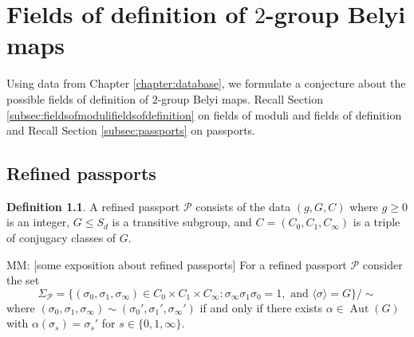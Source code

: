 \documentclass{dcthesis}
\newcommand{\PP}{\mathbb P}
\newcommand{\QQ}{\mathbb Q}
\newcommand{\defi}[1]{\textsf{#1}}
\newcommand{\mm}[1]{{\color{blue} \sf MM: [#1]}}
\DeclareMathOperator{\Aut}{Aut}
\newtheorem{theorem}[prop]{Theorem}
\theoremstyle{definition}
\newtheorem{definition}[prop]{Definition}
\theoremstyle{remark}
\numberwithin{equation}{section}
\numberwithin{figure}{section}
\begin{document}
\chapter{Fields of definition of $2$-group Belyi maps}{\label{chapter:fieldsofdefinition}
  Using data from Chapter \ref{chapter:database},
  we formulate a conjecture about the possible fields of definition of
  $2$-group Belyi maps.
  Recall Section
  \ref{subsec:fieldsofmodulifieldsofdefinition}
  on fields of moduli and fields of definition
  and
  Recall Section \ref{subsec:passports} on passports.
  \section{Refined passports}{\label{sec:refined}}{
    \begin{definition}\label{def:refined}
      A \defi{refined passport} $\mathcal{P}$ consists of the data
      $(g,G,C)$
      where $g\geq 0$ is an integer,
      $G\leq S_d$ is a transitive subgroup,
      and $C = (C_0,C_1,C_\infty)$
      is a triple of conjugacy classes of $G$.
    \end{definition}
    \mm{some exposition about refined passports}
    For a refined passport $\mathcal{P}$ consider the set
    \[
      \Sigma_\mathcal{P} =
      \{(\sigma_0,\sigma_1,\sigma_\infty)\in C_0\times C_1\times C_\infty : \sigma_\infty\sigma_1\sigma_0=1,\text{ and } \langle\sigma\rangle=G\}/\sim
    \]
    where $(\sigma_0,\sigma_1,\sigma_\infty)\sim(\sigma_0', \sigma_1', \sigma_\infty')$
    if and only if there exists $\alpha\in\Aut(G)$ with
    $\alpha(\sigma_s) = \sigma_s'$ for $s\in\{0,1,\infty\}$.
  }
}
\end{document}
